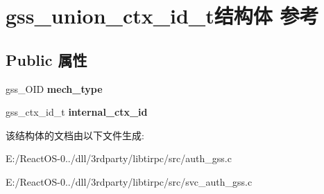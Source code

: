 \hypertarget{structgss__union__ctx__id__t}{}\section{gss\+\_\+union\+\_\+ctx\+\_\+id\+\_\+t结构体 参考}
\label{structgss__union__ctx__id__t}
\subsection*{Public 属性}
\begin{DoxyCompactItemize}
\item 
\mbox{\label{structgss__union__ctx__id__t_a10e93787e0f5de2d90353fcb01216980}} 
gss\+\_\+\+O\+ID {\bfseries mech\+\_\+type}
\item 
\mbox{\label{structgss__union__ctx__id__t_a5ad8f3f51694309567ae12f02938924c}} 
gss\+\_\+ctx\+\_\+id\+\_\+t {\bfseries internal\+\_\+ctx\+\_\+id}
\end{DoxyCompactItemize}


该结构体的文档由以下文件生成\+:\begin{DoxyCompactItemize}
\item 
E\+:/\+React\+O\+S-\/0../dll/3rdparty/libtirpc/src/auth\+\_\+gss.\+c\item 
E\+:/\+React\+O\+S-\/0../dll/3rdparty/libtirpc/src/svc\+\_\+auth\+\_\+gss.\+c\end{DoxyCompactItemize}
